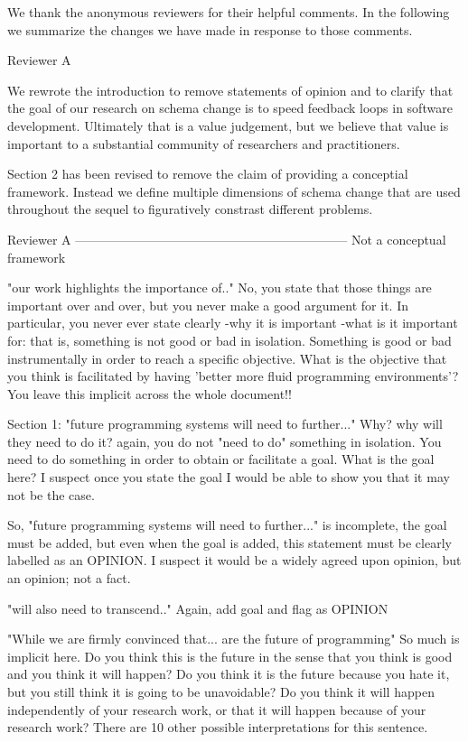 We thank the anonymous reviewers for their helpful comments. In the following we summarize the changes we have made in response to those comments.

Reviewer A

We rewrote the introduction to remove statements of opinion and to clarify that the goal of our research on schema change is to speed feedback loops in software development. Ultimately that is a value judgement, but we believe that value is important to a substantial community of researchers and practitioners.

Section 2 has been revised to remove the claim of providing a conceptial framework. Instead we define multiple dimensions of schema change that are used throughout the sequel to figuratively constrast different problems.




Reviewer A
-----------------------------------------------------------------
Not a conceptual framework

"our work highlights the importance of.." No, you state that those things are important over and over, but you never make a good argument for it. In particular, you never ever state clearly -why it is important -what is it important for: that is, something is not good or bad in isolation. Something is good or bad instrumentally in order to reach a specific objective. What is the objective that you think is facilitated by having 'better more fluid programming environments'? You leave this implicit across the whole document!!

Section 1: "future programming systems will need to further..." Why? why will they need to do it? again, you do not "need to do" something in isolation. You need to do something in order to obtain or facilitate a goal. What is the goal here? I suspect once you state the goal I would be able to show you that it may not be the case.

So, "future programming systems will need to further..." is incomplete, the goal must be added, but even when the goal is added, this statement must be clearly labelled as an OPINION. I suspect it would be a widely agreed upon opinion, but an opinion; not a fact.

"will also need to transcend.." Again, add goal and flag as OPINION

"While we are firmly convinced that... are the future of programming" So much is implicit here. Do you think this is the future in the sense that you think is good and you think it will happen? Do you think it is the future because you hate it, but you still think it is going to be unavoidable? Do you think it will happen independently of your research work, or that it will happen because of your research work? There are 10 other possible interpretations for this sentence.

